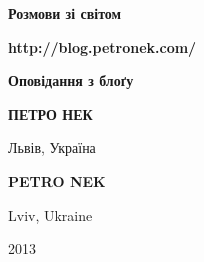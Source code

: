 \begin{titlepage}			%
\begin{center}				%

\vspace{80mm}

{\fontsize{20mm}{25mm}\selectfont
	\textbf{Розмови зі світом}
	}

\vspace{40mm}				%

{\fontsize{14pt}{14pt}\selectfont
	\textbf{http://blog.petronek.com/}
	}
	
\vspace{7pt}				%

{\fontsize{14pt}{14pt}\selectfont
	\textbf{Оповідання з блоґу}
	}
	
\vfill						%

\begin{multicols}{2}		%

{\fontsize{18pt}{18pt}\selectfont
	\textbf{\MakeUppercase{Петро Нек}}
	}

\vspace{5mm}				%

Львів, Україна

\columnbreak				%

{\fontsize{18pt}{18pt}\selectfont
	\textbf{\MakeUppercase{Petro Nek}}
	}

\vspace{5mm}				%

Lviv, Ukraine
\end{multicols}				%

\vspace{10mm}				%


{\small
\MakeUppercase{2013}
}\end{center}


\end{titlepage}